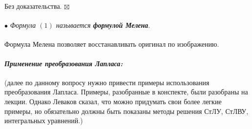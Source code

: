 \documentclass[a4paper, 12pt]{article}
\newenvironment{Proof} %
{\par\noindent{$\blacklozenge$}} %
{\hfill$\scriptstyle\boxtimes$}
\begin{document}
	\begin{Proof}
		Без доказательства.
	\end{Proof}\\\\
	$\bullet$ \textit{Формула $(1)$ называется \textbf{формулой Мелена}}.\\\\
	Формула Мелена позволяет восстанавливать оригинал по изображению.\\\\
	\textbf{\textit{Применение преобразования Лапласа:}}\\\\
	(далее по данному вопросу нужно привести примеры использования преобразования Лапласа. Примеры, разобранные в конспекте, были разобраны на лекции. Однако Леваков сказал, что можно придумать свои более легкие примеры, но обязательно должны быть показаны методы решения СтЛУ, СтЛВУ, интегральных уравнений.)
\end{document}
